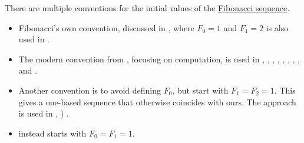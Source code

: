 \begin{remark}\label{rem:fibonacci_sequence_initial_value}
  There are multiple conventions for the initial values of the \hyperref[def:fibonacci_numbers]{Fibonacci sequence}.

  \begin{itemize}
    \item Fibonacci's own convention, discussed in , where \( F_0 = 1 \) and \( F_1 = 2 \) is also used in \cite[exerc. 5.5]{Treil2017LinearAlgebraDoneWrong}.

    \item The modern convention from , focusing on computation, is used in
    \cite[98]{Aigner1997CombinatorialTheory},
    \cite[467]{LidlNiederreiter1997FiniteFields},
    \cite[2]{CullFlahiveRobson2005DifferenceEquations}
    \cite[def. 2.4.5]{Rosen2019DiscreteMathematics},
    \cite[112]{ConwayGuy1998BookOfNumbers},
    \cite[122]{Mimram2020ProgramEqualsProof},
    \cite[98]{Erickson2019Algorithms},
    \cite[13]{Knuth1997ArtVol1},
    \cite[exerc. B-5.14(ii)]{Rotman2015AdvancedModernAlgebraPart1},
    \cite[59]{Мальцев1986Алгоритмы} and
    \cite[\S 5.7.3]{Новиков2013ДискретнаяМатематика}.

    \item Another convention is to avoid defining \( F_0 \), but start with \( F_1 = F_2 = 1 \). This gives a one-based sequence that otherwise coincides with ours. The approach is used in
    \cite[273]{Deza2012FigurateNumbers},
    \cite[example 1.1.12]{Stanley2012EnumerativeCombinatoricsVol1}
    \cite[exerc. 7.15]{ГашковЧубариков2005СложностьВычисления})
    \cite[97]{Зорич2019АнализЧасть1}.

    \item {} instead starts with \( F_0 = F_1 = 1 \).
  \end{itemize}
\end{remark}

